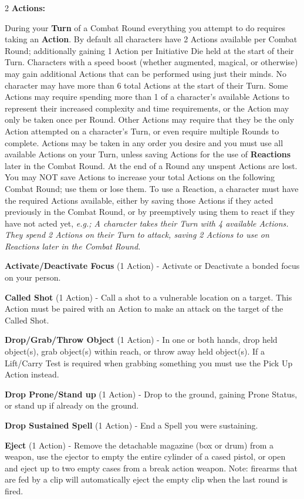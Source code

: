 \documentclass[
  oneside]{article}
\begin{document}
\begin{multicols}{2}
\textbf{Actions:}

During your \textbf{Turn} of a Combat Round
everything you attempt to do requires taking an
\textbf{Action}. By default all characters have 2
Actions available per Combat Round; additionally
gaining 1 Action per Initiative Die held at the
start of their Turn. Characters with a speed boost
(whether augmented, magical, or otherwise) may
gain additional Actions that can be performed
using just their minds. No character may have more
than 6 total Actions at the start of their Turn.
Some Actions may require spending more than 1 of a
character's available Actions to represent their
increased complexity and time requirements, or the
Action may only be taken once per Round. Other
Actions may require that they be the only Action
attempted on a character's Turn, or even require
multiple Rounds to complete. Actions may be taken
in any order you desire and you must use all
available Actions on your Turn, unless saving
Actions for the use of \textbf{Reactions} later in
the Combat Round. At the end of a Round any
unspent Actions are lost. You may NOT save Actions
to increase your total Actions on the following
Combat Round; use them or lose them. To use a
Reaction, a character must have the required
Actions available, either by saving those Actions
if they acted previously in the Combat Round, or
by preemptively using them to react if they have
not acted yet, \emph{e.g.; A character takes their
Turn with 4 available Actions. They spend 2
Actions on their Turn to attack, saving 2 Actions
to use on Reactions later in the Combat Round.}

\textbf{Activate/Deactivate Focus} (1 Action) -
Activate or Deactivate a bonded focus on your
person.

\textbf{Called Shot} (1 Action) - Call a shot to a
vulnerable location on a target. This Action must
be paired with an Action to make an attack on the
target of the Called Shot.

\textbf{Drop/Grab/Throw Object} (1 Action) - In
one or both hands, drop held object(s), grab
object(s) within reach, or throw away held
object(s). If a Lift/Carry Test is required when
grabbing something you must use the Pick Up Action
instead.

\textbf{Drop Prone/Stand up} (1 Action) - Drop to
the ground, gaining Prone Status, or stand up if
already on the ground.

\textbf{Drop Sustained Spell} (1 Action) - End a
Spell you were sustaining.

\textbf{Eject} (1 Action) - Remove the detachable
magazine (box or drum) from a weapon, use the
ejector to empty the entire cylinder of a cased
pistol, or open and eject up to two empty cases
from a break action weapon. Note: firearms that
are fed by a clip will automatically eject the
empty clip when the last round is fired.


\end{multicols}
\end{document}
